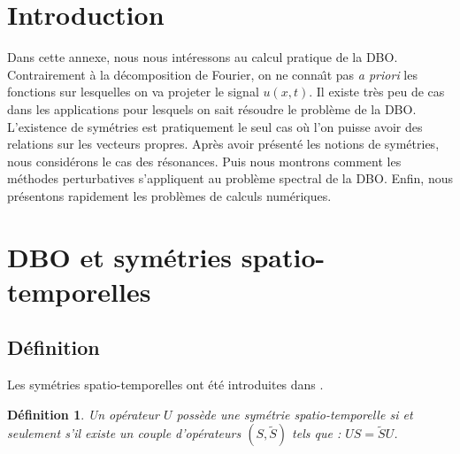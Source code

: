 \documentclass{book}
\newtheorem{defn}{D\'efinition}[chapter]
\begin{document}
\section{Introduction}
Dans cette annexe, nous nous int\'eressons au calcul pratique de la
DBO. 
Contrairement \`a la d\'ecomposition de Fourier, on ne conna\^\i t
pas {\it a priori} les fonctions sur lesquelles on va projeter
le signal $u(x,t)$.
Il existe tr\`es peu de cas dans les applications
pour lesquels on sait r\'esoudre le probl\`eme
de la DBO.
L'existence de sym\'etries est pratiquement le seul cas 
o\`u l'on puisse avoir des relations sur les vecteurs propres.
Apr\`es avoir pr\'esent\'e les notions de sym\'etries, nous
consid\'erons le cas des r\'esonances.
Puis nous montrons comment les m\'ethodes perturbatives s'appliquent
au probl\`eme spectral de la DBO.
Enfin, nous pr\'esentons rapidement les probl\`emes de calculs
num\'eriques. 

\section{DBO et sym\'etries spatio-temporelles}\label{chapsym}
\subsection{D\'efinition}
Les sym\'etries spatio-temporelles ont \'et\'e introduites dans
\cite{Aubry92}.

\begin{defn}
Un op\'erateur $U$ poss\`ede une sym\'etrie spa\-tio-tem\-po\-relle
si et seu\-le\-ment s'il existe un couple d'op\'erateurs $(S,\tilde
S)$ tels que : 
$US=\tilde SU$.
\end{defn}
\end{document}
